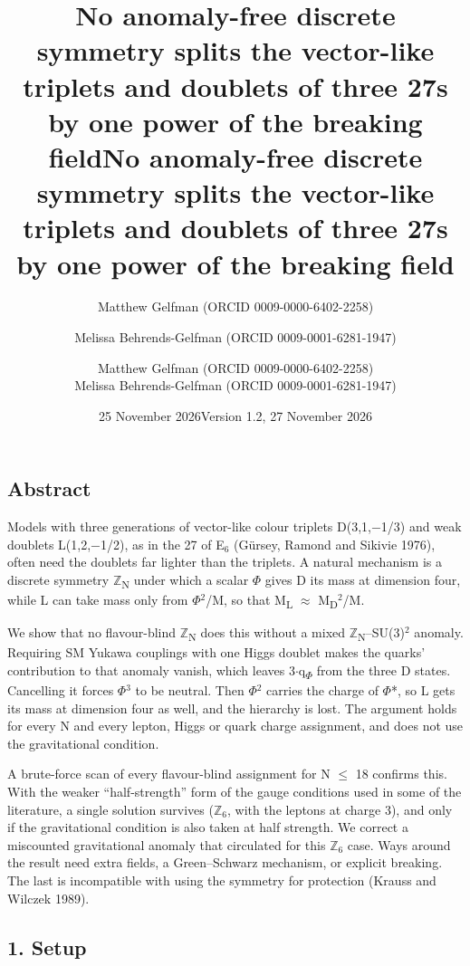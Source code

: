 \documentclass[
  11pt,
]{article}
\title{No anomaly-free discrete symmetry splits the vector-like triplets
and doublets of three 27s by one power of the breaking field}
\author{Matthew Gelfman (ORCID 0009-0000-6402-2258) \and Melissa
Behrends-Gelfman (ORCID 0009-0001-6281-1947)}
\date{25 November 2026}
\title{No anomaly-free discrete symmetry splits the vector-like triplets and
doublets of three 27s by one power of the breaking field}
\author{Matthew Gelfman (ORCID 0009-0000-6402-2258) \\ Melissa Behrends-Gelfman (ORCID 0009-0001-6281-1947)}
\date{Version 1.2, 27 November 2026}
\begin{document}
\maketitle
\hypertarget{abstract}{%
\subsection{Abstract}\label{abstract}}

Models with three generations of vector-like colour triplets D(3,1,\ensuremath{-}1/3) and weak doublets L(1,2,\ensuremath{-}1/2), as in the 27 of E\ensuremath{_{6}} (Gürsey, Ramond and Sikivie 1976), often need the doublets far lighter than the triplets. A natural mechanism is a discrete symmetry \ensuremath{\mathbb{Z}}\textsubscript{N} under which a scalar \ensuremath{\Phi} gives D its mass at dimension four, while L can take mass only from \ensuremath{\Phi}\ensuremath{^{2}}/M, so that M\textsubscript{L} \ensuremath{\approx} M\textsubscript{D}\ensuremath{^{2}}/M.

We show that no flavour-blind \ensuremath{\mathbb{Z}}\textsubscript{N} does this without a mixed \ensuremath{\mathbb{Z}}\textsubscript{N}--SU(3)\ensuremath{^{2}} anomaly. Requiring SM Yukawa couplings with one Higgs doublet makes the quarks' contribution to that anomaly vanish, which leaves 3\ensuremath{\cdot}q\textsubscript{\ensuremath{\Phi}} from the three D states. Cancelling it forces \ensuremath{\Phi}\ensuremath{^{3}} to be neutral. Then \ensuremath{\Phi}\ensuremath{^{2}} carries the charge of \ensuremath{\Phi}*, so L gets its mass at dimension four as well, and the hierarchy is lost. The argument holds for every N and every lepton, Higgs or quark charge assignment, and does not use the gravitational condition.

A brute-force scan of every flavour-blind assignment for N \ensuremath{\le} 18 confirms this. With the weaker ``half-strength'' form of the gauge conditions used in some of the literature, a single solution survives (\ensuremath{\mathbb{Z}}\ensuremath{_{6}}, with the leptons at charge 3), and only if the gravitational condition is also taken at half strength. We correct a miscounted gravitational anomaly that circulated for this \ensuremath{\mathbb{Z}}\ensuremath{_{6}} case. Ways around the result need extra fields, a Green--Schwarz mechanism, or explicit breaking. The last is incompatible with using the symmetry for protection (Krauss and Wilczek 1989).

\hypertarget{setup}{%
\subsection{1. Setup}\label{setup}}
\end{document}
